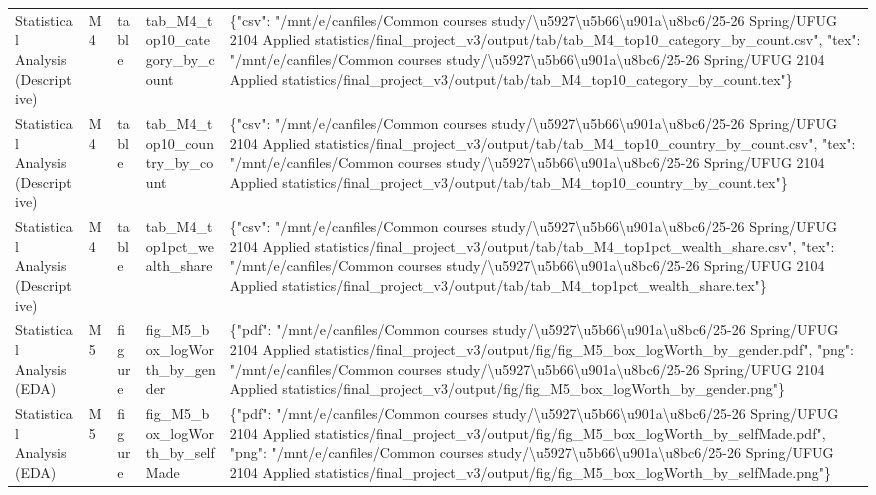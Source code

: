 \begin{tabular}{lllll}
Statistical Analysis (Descriptive) & M4 & table & tab\_M4\_top10\_category\_by\_count & \{"csv": "/mnt/e/canfiles/Common courses study/\textbackslash u5927\textbackslash u5b66\textbackslash u901a\textbackslash u8bc6/25-26 Spring/UFUG 2104 Applied statistics/final\_project\_v3/output/tab/tab\_M4\_top10\_category\_by\_count.csv", "tex": "/mnt/e/canfiles/Common courses study/\textbackslash u5927\textbackslash u5b66\textbackslash u901a\textbackslash u8bc6/25-26 Spring/UFUG 2104 Applied statistics/final\_project\_v3/output/tab/tab\_M4\_top10\_category\_by\_count.tex"\} \\
Statistical Analysis (Descriptive) & M4 & table & tab\_M4\_top10\_country\_by\_count & \{"csv": "/mnt/e/canfiles/Common courses study/\textbackslash u5927\textbackslash u5b66\textbackslash u901a\textbackslash u8bc6/25-26 Spring/UFUG 2104 Applied statistics/final\_project\_v3/output/tab/tab\_M4\_top10\_country\_by\_count.csv", "tex": "/mnt/e/canfiles/Common courses study/\textbackslash u5927\textbackslash u5b66\textbackslash u901a\textbackslash u8bc6/25-26 Spring/UFUG 2104 Applied statistics/final\_project\_v3/output/tab/tab\_M4\_top10\_country\_by\_count.tex"\} \\
Statistical Analysis (Descriptive) & M4 & table & tab\_M4\_top1pct\_wealth\_share & \{"csv": "/mnt/e/canfiles/Common courses study/\textbackslash u5927\textbackslash u5b66\textbackslash u901a\textbackslash u8bc6/25-26 Spring/UFUG 2104 Applied statistics/final\_project\_v3/output/tab/tab\_M4\_top1pct\_wealth\_share.csv", "tex": "/mnt/e/canfiles/Common courses study/\textbackslash u5927\textbackslash u5b66\textbackslash u901a\textbackslash u8bc6/25-26 Spring/UFUG 2104 Applied statistics/final\_project\_v3/output/tab/tab\_M4\_top1pct\_wealth\_share.tex"\} \\
Statistical Analysis (EDA) & M5 & figure & fig\_M5\_box\_logWorth\_by\_gender & \{"pdf": "/mnt/e/canfiles/Common courses study/\textbackslash u5927\textbackslash u5b66\textbackslash u901a\textbackslash u8bc6/25-26 Spring/UFUG 2104 Applied statistics/final\_project\_v3/output/fig/fig\_M5\_box\_logWorth\_by\_gender.pdf", "png": "/mnt/e/canfiles/Common courses study/\textbackslash u5927\textbackslash u5b66\textbackslash u901a\textbackslash u8bc6/25-26 Spring/UFUG 2104 Applied statistics/final\_project\_v3/output/fig/fig\_M5\_box\_logWorth\_by\_gender.png"\} \\
Statistical Analysis (EDA) & M5 & figure & fig\_M5\_box\_logWorth\_by\_selfMade & \{"pdf": "/mnt/e/canfiles/Common courses study/\textbackslash u5927\textbackslash u5b66\textbackslash u901a\textbackslash u8bc6/25-26 Spring/UFUG 2104 Applied statistics/final\_project\_v3/output/fig/fig\_M5\_box\_logWorth\_by\_selfMade.pdf", "png": "/mnt/e/canfiles/Common courses study/\textbackslash u5927\textbackslash u5b66\textbackslash u901a\textbackslash u8bc6/25-26 Spring/UFUG 2104 Applied statistics/final\_project\_v3/output/fig/fig\_M5\_box\_logWorth\_by\_selfMade.png"\} \\

\end{tabular}
